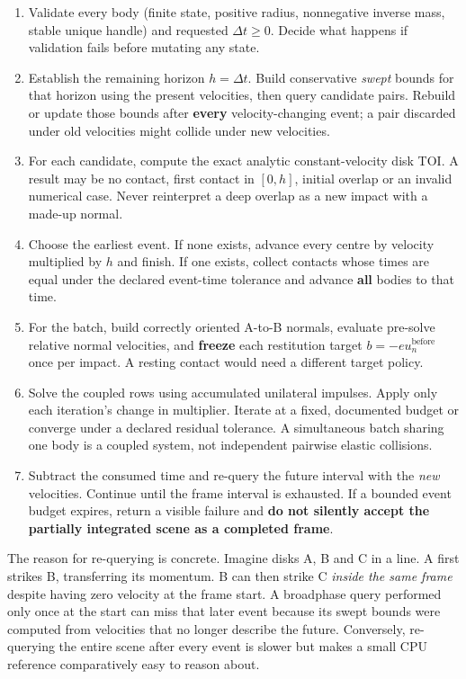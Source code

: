 \begin{enumerate}
\def\labelenumi{\arabic{enumi}.}
\tightlist
\item
  Validate every body (finite state, positive radius, nonnegative inverse mass, stable unique handle) and requested \(\Delta t\ge0\). Decide what happens if validation fails before mutating any state.
\item
  Establish the remaining horizon \(h=\Delta t\). Build conservative \emph{swept} bounds for that horizon using the present velocities, then query candidate pairs. Rebuild or update those bounds after \textbf{every} velocity-changing event; a pair discarded under old velocities might collide under new velocities.
\item
  For each candidate, compute the exact analytic constant-velocity disk TOI. A result may be no contact, first contact in \([0,h]\), initial overlap or an invalid numerical case. Never reinterpret a deep overlap as a new impact with a made-up normal.
\item
  Choose the earliest event. If none exists, advance every centre by velocity multiplied by \(h\) and finish. If one exists, collect contacts whose times are equal under the declared event-time tolerance and advance \textbf{all} bodies to that time.
\item
  For the batch, build correctly oriented A-to-B normals, evaluate pre-solve relative normal velocities, and \textbf{freeze} each restitution target \(b=-e u_n^{\mathrm{before}}\) once per impact. A resting contact would need a different target policy.
\item
  Solve the coupled rows using accumulated unilateral impulses. Apply only each iteration's change in multiplier. Iterate at a fixed, documented budget or converge under a declared residual tolerance. A simultaneous batch sharing one body is a coupled system, not independent pairwise elastic collisions.
\item
  Subtract the consumed time and re-query the future interval with the \emph{new} velocities. Continue until the frame interval is exhausted. If a bounded event budget expires, return a visible failure and \textbf{do not silently accept the partially integrated scene as a completed frame}.
\end{enumerate}

The reason for re-querying is concrete. Imagine disks A, B and C in a line. A first strikes B, transferring its momentum. B can then strike C \emph{inside the same frame} despite having zero velocity at the frame start. A broadphase query performed only once at the start can miss that later event because its swept bounds were computed from velocities that no longer describe the future. Conversely, re-querying the entire scene after every event is slower but makes a small CPU reference comparatively easy to reason about.

